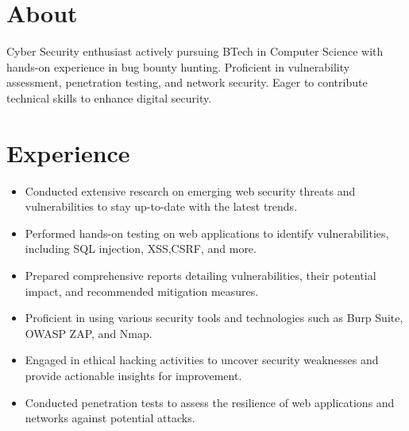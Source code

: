 \documentclass[]{roshan_resume}
\begin{document}
	\hfill
	\begin{minipage}[t]{0.66\textwidth} 
		
		\section{About}
		Cyber Security enthusiast actively pursuing BTech in Computer Science with hands-on experience in bug bounty hunting. Proficient in vulnerability assessment, penetration testing, and network security. Eager to contribute technical skills to enhance digital security.
		\newline
		
		
		\section{Experience}
		\begin{itemize}
			\item Conducted extensive research on emerging web security threats and vulnerabilities to stay up-to-date with the latest trends. \\
			\item Performed hands-on testing on web applications to identify vulnerabilities, including SQL injection, XSS,CSRF, and more.
			\item Prepared comprehensive reports detailing
			vulnerabilities, their potential impact, and
			recommended mitigation measures. \\
			\item Proficient in using various security tools and
			technologies such as Burp Suite, OWASP ZAP, and Nmap.\\
			\item Engaged in ethical hacking activities to uncover
			security weaknesses and provide actionable insights for
			improvement.\\
			\item Conducted penetration tests to assess the resilience of
			web applications and networks against potential
			attacks.\\
		\end{itemize}
		

\end{minipage}
\end{document}
